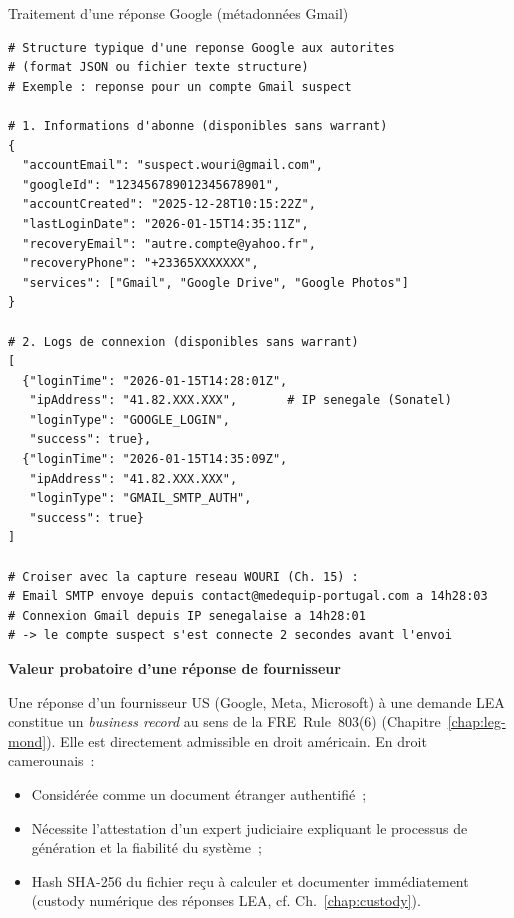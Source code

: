 \begin{boxoutils}{Traitement d'une réponse Google (métadonnées Gmail)}
\begin{lstlisting}[language=bash_forensique]
# Structure typique d'une reponse Google aux autorites
# (format JSON ou fichier texte structure)
# Exemple : reponse pour un compte Gmail suspect

# 1. Informations d'abonne (disponibles sans warrant)
{
  "accountEmail": "suspect.wouri@gmail.com",
  "googleId": "123456789012345678901",
  "accountCreated": "2025-12-28T10:15:22Z",
  "lastLoginDate": "2026-01-15T14:35:11Z",
  "recoveryEmail": "autre.compte@yahoo.fr",
  "recoveryPhone": "+23365XXXXXXX",
  "services": ["Gmail", "Google Drive", "Google Photos"]
}

# 2. Logs de connexion (disponibles sans warrant)
[
  {"loginTime": "2026-01-15T14:28:01Z",
   "ipAddress": "41.82.XXX.XXX",       # IP senegale (Sonatel)
   "loginType": "GOOGLE_LOGIN",
   "success": true},
  {"loginTime": "2026-01-15T14:35:09Z",
   "ipAddress": "41.82.XXX.XXX",
   "loginType": "GMAIL_SMTP_AUTH",
   "success": true}
]

# Croiser avec la capture reseau WOURI (Ch. 15) :
# Email SMTP envoye depuis contact@medequip-portugal.com a 14h28:03
# Connexion Gmail depuis IP senegalaise a 14h28:01
# -> le compte suspect s'est connecte 2 secondes avant l'envoi
\end{lstlisting}
\end{boxoutils}

\begin{boxjuris}
\textbf{Valeur probatoire d'une réponse de fournisseur}

Une réponse d'un fournisseur US (Google, Meta, Microsoft) à une
demande LEA constitue un \textit{business record} au sens de la
FRE~Rule~803(6) (Chapitre~\ref{chap:leg-mond}). Elle est directement
admissible en droit américain. En droit camerounais~:
\begin{itemize}
    \item Considérée comme un document étranger authentifié~;
    \item Nécessite l'attestation d'un expert judiciaire expliquant
          le processus de génération et la fiabilité du système~;
    \item Hash SHA-256 du fichier reçu à calculer et documenter
          immédiatement (custody numérique des réponses LEA,
          cf. Ch.~\ref{chap:custody}).
\end{itemize}
\end{boxjuris}

